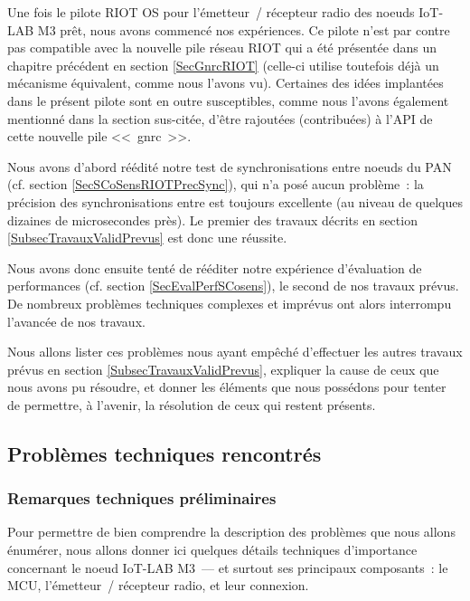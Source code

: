 \bigskip

Une fois le pilote RIOT OS pour l'émetteur~/ récepteur radio des noeuds
IoT-LAB M3 prêt, nous avons commencé nos expériences. Ce pilote n'est
par contre pas compatible avec la nouvelle pile réseau RIOT qui a été
présentée dans un chapitre précédent en section \vref{SecGnrcRIOT}
(celle-ci utilise toutefois déjà un mécanisme équivalent, comme nous
l'avons vu). Certaines des idées implantées dans le présent pilote
sont en outre susceptibles, comme nous l'avons également mentionné dans
la section sus-citée, d'être rajoutées (contribuées) à l'API de cette
nouvelle pile <<~gnrc~>>.

\bigskip

Nous avons d'abord réédité notre test de synchronisations entre noeuds
du PAN (cf. section \vref{SecSCoSensRIOTPrecSync}), qui n'a posé aucun
problème~: la précision des synchronisations entre  est
toujours excellente (au niveau de quelques dizaines de microsecondes près).
Le premier des travaux décrits en section \vref{SubsecTravauxValidPrevus}
est donc une réussite.

\bigskip

Nous avons donc ensuite tenté de rééditer notre expérience d'évaluation
de performances (cf. section \vref {SecEvalPerfSCosens}), le second de nos
travaux prévus. De nombreux problèmes techniques complexes et imprévus ont
alors interrompu l'avancée de nos travaux.

Nous allons lister ces problèmes nous ayant empêché d'effectuer les autres
travaux prévus en section \vref{SubsecTravauxValidPrevus}, expliquer la
cause de ceux que nous avons pu résoudre, et donner les éléments que nous
possédons pour tenter de permettre, à l'avenir, la résolution de ceux qui
restent présents.


\subsection{Problèmes techniques rencontrés}
\label{SubsecPbTech}

\subsubsection{Remarques techniques préliminaires}
\label{ParTechnoMote}

Pour permettre de bien comprendre la description des problèmes que nous
allons énumérer, nous allons donner ici quelques détails techniques
d'importance concernant le noeud IoT-LAB M3~--- et surtout ses principaux
composants~: le MCU, l'émetteur~/ récepteur radio, et leur connexion.


